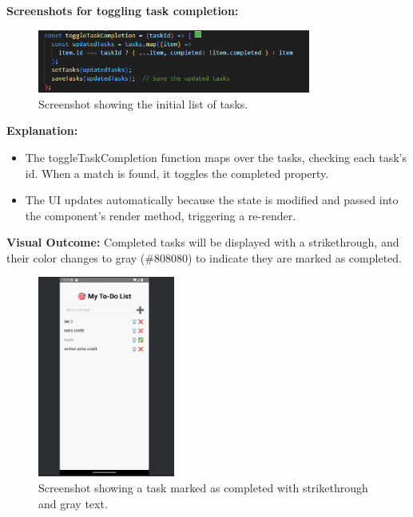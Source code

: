 \documentclass[12pt]{article}
\begin{document}
\textbf{Screenshots for toggling task completion:}  
\begin{figure}[H]
    \centering
    \includegraphics[width=0.8\textwidth]{images/completed1.png} 
    \caption{Screenshot showing the initial list of tasks.}
    \label{fig:toggle-task-1}
\end{figure}
\textbf{Explanation:}
\begin{itemize}[left=1.5em]
    \item The toggleTaskCompletion function maps over the tasks, checking each task's id. When a match is found, it toggles the completed property.
    \item The UI updates automatically because the state is modified and passed into the component's render method, triggering a re-render.
\end{itemize}
\textbf{Visual Outcome:}  
Completed tasks will be displayed with a strikethrough, and their color changes to gray (\#808080) to indicate they are marked as completed.

\begin{figure}[H]
    \centering
    \includegraphics[width=0.4\textwidth]{images/completed3.png} 
    \caption{Screenshot showing a task marked as completed with strikethrough and gray text.}
    \label{fig:toggle-task-2}
\end{figure}
\end{document}
